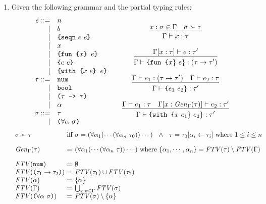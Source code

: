 \begin{enumerate}
\item Given the following grammar and the partial typing rules:
\[
\begin{array}{ll}
\begin{array}{rl}
e ::= & n\\
\mid& b\\
\mid& \verb!{seqn!\ e\ e\verb+}+\\
\mid& x\\
\mid& \verb+{fun {+x\verb+} + e\verb+}+\\
\mid& \verb+{+e\ e \verb+}+\\
\mid& \verb+{with {+x\ e\verb+} + e\verb+}+\\
\tau ::= & \verb+num+\\
\mid&\verb!bool!\\
\mid&\verb+(+\tau\verb+ -> +\tau\verb+)+\\
\mid&\alpha\\
\sigma ::= & \tau\\
\mid&\verb+(+\forall \alpha\ \sigma\verb+)+\\
\end{array}
&
\begin{array}{c}

\newinfrule
{x : \sigma \in \Gamma\rulesep
\sigma \succ \tau}
{\Gamma\vdash x : \tau}
\\[2em]
\newinfrule{
\Gamma[x : \tau]\vdash e : \tau'
}
{\Gamma\vdash \mbox{\texttt{\{fun \{}}x\}\ e\} : (\tau\rightarrow\tau')}
\\[2em]
\newinfrule{
\Gamma\vdash e_1 : (\tau\rightarrow\tau')
\rulesep
\Gamma\vdash e_2 : \tau
}
{\Gamma\vdash \mbox{\texttt{\{}}e_1\ e_2\} : \tau'}
\\[2em]
\newinfrule{
\Gamma\vdash e_1 : \tau
\rulesep
\Gamma[x : \mathit{Gen}_\Gamma(\tau)]\vdash e_2 : \tau'
}
{\Gamma\vdash \mbox{\texttt{\{with \{}}x\ e_1\}\ e_2\} : \tau'}
\end{array}
\end{array}
\]
\[
\begin{array}{l@{~}l@{~}l}
\sigma \succ \tau &\mbox{iff}& \sigma = (\forall \alpha_1 ( \cdots (\forall \alpha_n\ \tau_0)) \cdots)\ \ \wedge\ \
\tau = \tau_0[\alpha_i \leftarrow \tau_i]\ \mbox{where }1 \le i \le n
\\[1em]
\mathit{Gen}_\Gamma(\tau) &=& (\forall \alpha_1 ( \cdots (\forall \alpha_n\ \tau)) \cdots)\
\mbox{where } \{\alpha_1, \cdots, \alpha_n\} = \mathit{FTV}(\tau) \setminus \mathit{FTV}(\Gamma)
\\[1em]
\mathit{FTV}(\mbox{\texttt{num}}) &=& \emptyset
\\
\mathit{FTV}(\mbox{\texttt{(}}\tau_1\rightarrow\tau_2\mbox{\texttt{)}}) &=& \mathit{FTV}(\tau_1) \cup \mathit{FTV}(\tau_2)
\\
\mathit{FTV}(\alpha) &=& \{\alpha\}
\\
\mathit{FTV}(\Gamma) &=& \bigcup_{x:\sigma \in \Gamma}\mathit{FTV}(\sigma)\\
\mathit{FTV}(\mbox{\texttt{(}}\forall\alpha\ \sigma\mbox{\texttt{)}}) &=& \mathit{FTV}(\sigma) \setminus \{\alpha\}
\\
\end{array}
\]


\end{enumerate}
